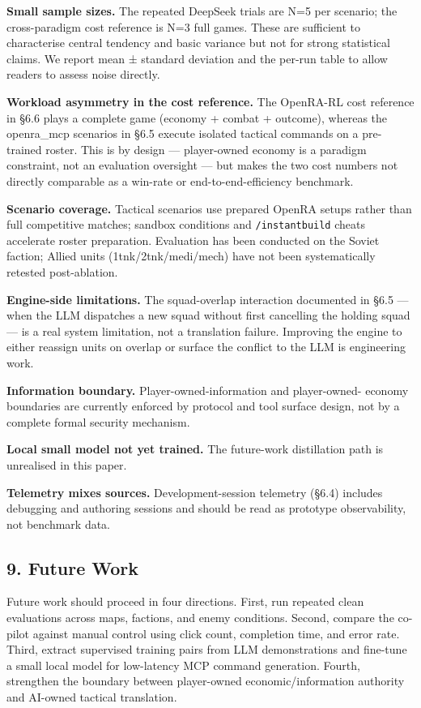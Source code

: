 \documentclass[
  journal]{IEEEtran}
\begin{document}
\textbf{Small sample sizes.} The repeated DeepSeek trials are N=5 per
scenario; the cross-paradigm cost reference is N=3 full games. These are
sufficient to characterise central tendency and basic variance but not
for strong statistical claims. We report mean ± standard deviation and
the per-run table to allow readers to assess noise directly.

\textbf{Workload asymmetry in the cost reference.} The OpenRA-RL cost
reference in §6.6 plays a complete game (economy + combat + outcome),
whereas the openra\_mcp scenarios in §6.5 execute isolated tactical
commands on a pre-trained roster. This is by design --- player-owned
economy is a paradigm constraint, not an evaluation oversight --- but
makes the two cost numbers not directly comparable as a win-rate or
end-to-end-efficiency benchmark.

\textbf{Scenario coverage.} Tactical scenarios use prepared OpenRA
setups rather than full competitive matches; sandbox conditions and
\texttt{/instantbuild} cheats accelerate roster preparation. Evaluation
has been conducted on the Soviet faction; Allied units
(1tnk/2tnk/medi/mech) have not been systematically retested
post-ablation.

\textbf{Engine-side limitations.} The squad-overlap interaction
documented in §6.5 --- when the LLM dispatches a new squad without first
cancelling the holding squad --- is a real system limitation, not a
translation failure. Improving the engine to either reassign units on
overlap or surface the conflict to the LLM is engineering work.

\textbf{Information boundary.} Player-owned-information and
player-owned- economy boundaries are currently enforced by protocol and
tool surface design, not by a complete formal security mechanism.

\textbf{Local small model not yet trained.} The future-work distillation
path is unrealised in this paper.

\textbf{Telemetry mixes sources.} Development-session telemetry (§6.4)
includes debugging and authoring sessions and should be read as
prototype observability, not benchmark data.

\subsection{9. Future Work}\label{future-work}

Future work should proceed in four directions. First, run repeated clean
evaluations across maps, factions, and enemy conditions. Second, compare
the co-pilot against manual control using click count, completion time,
and error rate. Third, extract supervised training pairs from LLM
demonstrations and fine-tune a small local model for low-latency MCP
command generation. Fourth, strengthen the boundary between player-owned
economic/information authority and AI-owned tactical translation.
\end{document}
